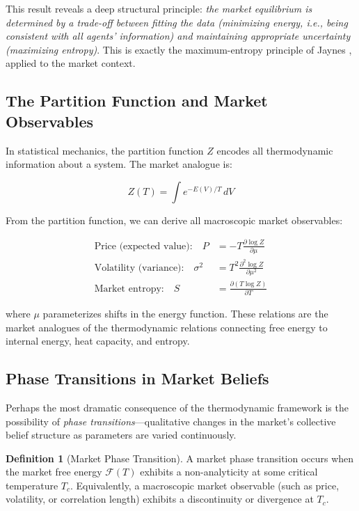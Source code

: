 \documentclass[12pt,a4paper]{article}
\theoremstyle{definition}
\newtheorem{definition}[theorem]{Definition}
\begin{document}
This result reveals a deep structural principle: \emph{the market equilibrium is determined by a trade-off between fitting the data (minimizing energy, i.e., being consistent with all agents' information) and maintaining appropriate uncertainty (maximizing entropy)}. This is exactly the maximum-entropy principle of Jaynes \citep{jaynes1957}, applied to the market context.

\subsection{The Partition Function and Market Observables}

In statistical mechanics, the partition function $Z$ encodes all thermodynamic information about a system. The market analogue is:

\begin{equation}\label{eq:partition}
    Z(T) = \int e^{-E(V)/T} \, dV
\end{equation}

From the partition function, we can derive all macroscopic market observables:

\begin{align}
    \text{Price (expected value):} \quad P &= -T \frac{\partial \log Z}{\partial \mu} \label{eq:price_from_Z} \\
    \text{Volatility (variance):} \quad \sigma^2 &= T^2 \frac{\partial^2 \log Z}{\partial \mu^2} \label{eq:vol_from_Z} \\
    \text{Market entropy:} \quad S &= \frac{\partial (T \log Z)}{\partial T} \label{eq:entropy_from_Z}
\end{align}

where $\mu$ parameterizes shifts in the energy function. These relations are the market analogues of the thermodynamic relations connecting free energy to internal energy, heat capacity, and entropy.

\subsection{Phase Transitions in Market Beliefs}

Perhaps the most dramatic consequence of the thermodynamic framework is the possibility of \emph{phase transitions}---qualitative changes in the market's collective belief structure as parameters are varied continuously.

\begin{definition}[Market Phase Transition]\label{def:phase_transition}
A market phase transition occurs when the market free energy $\mathcal{F}(T)$ exhibits a non-analyticity at some critical temperature $T_c$. Equivalently, a macroscopic market observable (such as price, volatility, or correlation length) exhibits a discontinuity or divergence at $T_c$.
\end{definition}
\end{document}

